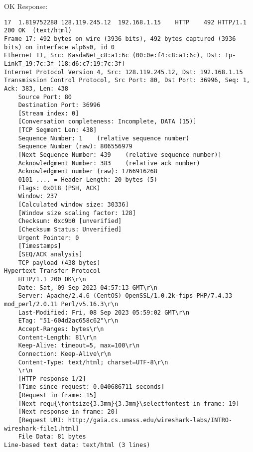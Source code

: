 \documentclass[12pt]{article}
\begin{document}
OK Response:
{\fontsize{3.3mm}{3.3mm}\selectfont
\begin{verbatim}
17	1.819752288	128.119.245.12	192.168.1.15	HTTP	492	HTTP/1.1 200 OK  (text/html)
Frame 17: 492 bytes on wire (3936 bits), 492 bytes captured (3936 bits) on interface wlp6s0, id 0
Ethernet II, Src: KasdaNet_c8:a1:6c (00:0e:f4:c8:a1:6c), Dst: Tp-LinkT_19:7c:3f (18:d6:c7:19:7c:3f)
Internet Protocol Version 4, Src: 128.119.245.12, Dst: 192.168.1.15
Transmission Control Protocol, Src Port: 80, Dst Port: 36996, Seq: 1, Ack: 383, Len: 438
    Source Port: 80
    Destination Port: 36996
    [Stream index: 0]
    [Conversation completeness: Incomplete, DATA (15)]
    [TCP Segment Len: 438]
    Sequence Number: 1    (relative sequence number)
    Sequence Number (raw): 806556979
    [Next Sequence Number: 439    (relative sequence number)]
    Acknowledgment Number: 383    (relative ack number)
    Acknowledgment number (raw): 1766916268
    0101 .... = Header Length: 20 bytes (5)
    Flags: 0x018 (PSH, ACK)
    Window: 237
    [Calculated window size: 30336]
    [Window size scaling factor: 128]
    Checksum: 0xc9b0 [unverified]
    [Checksum Status: Unverified]
    Urgent Pointer: 0
    [Timestamps]
    [SEQ/ACK analysis]
    TCP payload (438 bytes)
Hypertext Transfer Protocol
    HTTP/1.1 200 OK\r\n
    Date: Sat, 09 Sep 2023 04:57:13 GMT\r\n
    Server: Apache/2.4.6 (CentOS) OpenSSL/1.0.2k-fips PHP/7.4.33 mod_perl/2.0.11 Perl/v5.16.3\r\n
    Last-Modified: Fri, 08 Sep 2023 05:59:02 GMT\r\n
    ETag: "51-604d2ac658c62"\r\n
    Accept-Ranges: bytes\r\n
    Content-Length: 81\r\n
    Keep-Alive: timeout=5, max=100\r\n
    Connection: Keep-Alive\r\n
    Content-Type: text/html; charset=UTF-8\r\n
    \r\n
    [HTTP response 1/2]
    [Time since request: 0.040686711 seconds]
    [Request in frame: 15]
    [Next requ{\fontsize{3.3mm}{3.3mm}\selectfontest in frame: 19]
    [Next response in frame: 20]
    [Request URI: http://gaia.cs.umass.edu/wireshark-labs/INTRO-wireshark-file1.html]
    File Data: 81 bytes
Line-based text data: text/html (3 lines)
\end{verbatim}}
\end{document}
